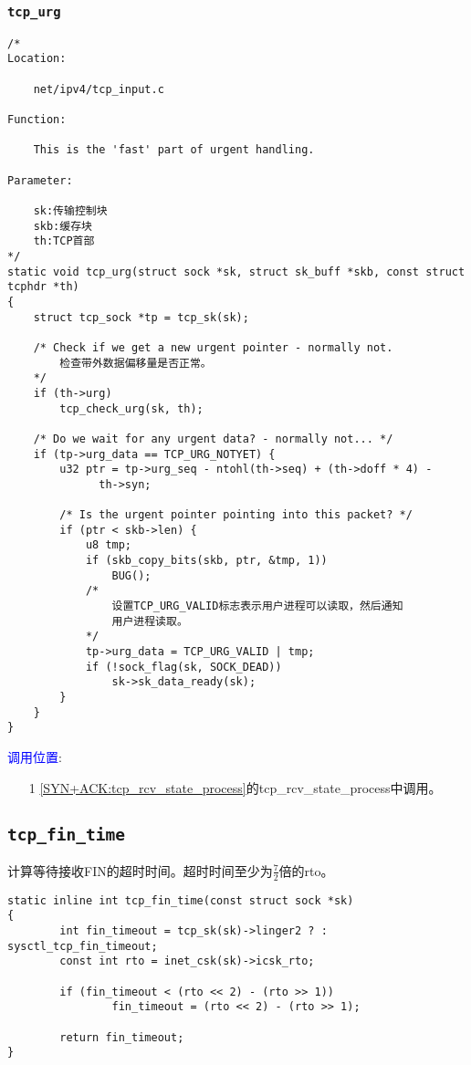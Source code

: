         \subsubsection{\texttt{tcp_urg}}
            \label{TCPUrgent:tcp_urg}
\begin{verbatim}
/*
Location:

    net/ipv4/tcp_input.c

Function:

    This is the 'fast' part of urgent handling. 

Parameter:

    sk:传输控制块
    skb:缓存块
    th:TCP首部
*/
static void tcp_urg(struct sock *sk, struct sk_buff *skb, const struct tcphdr *th)
{
    struct tcp_sock *tp = tcp_sk(sk);

    /* Check if we get a new urgent pointer - normally not. 
        检查带外数据偏移量是否正常。
    */
    if (th->urg)
        tcp_check_urg(sk, th);

    /* Do we wait for any urgent data? - normally not... */
    if (tp->urg_data == TCP_URG_NOTYET) {
        u32 ptr = tp->urg_seq - ntohl(th->seq) + (th->doff * 4) -
              th->syn;

        /* Is the urgent pointer pointing into this packet? */
        if (ptr < skb->len) {
            u8 tmp;
            if (skb_copy_bits(skb, ptr, &tmp, 1))
                BUG();
            /*
                设置TCP_URG_VALID标志表示用户进程可以读取，然后通知
                用户进程读取。
            */
            tp->urg_data = TCP_URG_VALID | tmp;
            if (!sock_flag(sk, SOCK_DEAD))
                sk->sk_data_ready(sk);
        }
    }
}
\end{verbatim}    

        \textcolor{blue}{调用位置}:

            \begin{enumerate}
            \item[1]        \ref{SYN+ACK:tcp_rcv_state_process}的tcp\_rcv\_state\_process中调用。
            \end{enumerate}

    \subsection{\texttt{tcp_fin_time}}
        计算等待接收FIN的超时时间。超时时间至少为$\frac{7}{2}$倍的rto。
\begin{verbatim}
static inline int tcp_fin_time(const struct sock *sk)
{
        int fin_timeout = tcp_sk(sk)->linger2 ? : sysctl_tcp_fin_timeout;
        const int rto = inet_csk(sk)->icsk_rto;

        if (fin_timeout < (rto << 2) - (rto >> 1))
                fin_timeout = (rto << 2) - (rto >> 1);

        return fin_timeout;
}
\end{verbatim}
